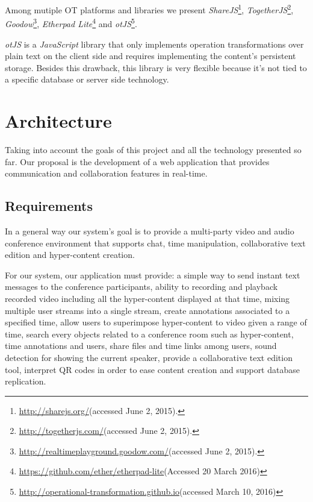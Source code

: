 \documentclass[conference,compsoc,a4paper]{IEEEtran}
\begin{document}
	Among mutiple \gls{OT} platforms and libraries we present \emph{ShareJS}\footnote{\url{http://sharejs.org/}(accessed June 2, 2015).}, \emph{TogetherJS}\footnote{\url{http://togetherjs.com/}(accessed June 2, 2015).}, \emph{Goodow}\footnote{\url{http://realtimeplayground.goodow.com/}(accessed June 2, 2015).}, \emph{Etherpad Lite}\footnote{\url{https://github.com/ether/etherpad-lite}(Accessed 20 March 2016)} and \emph{otJS}\footnote{\url{http://operational-transformation.github.io}(accessed March 10, 2016)}.


	\emph{otJS} is a \emph{JavaScript} library that only implements operation transformations over plain text on the client side and requires implementing the content's persistent storage. Besides this drawback, this library is very flexible because it's not tied to a specific database or server side technology.
        


\section{Architecture}
\label{chapter:architecture}

Taking into account the goals of this project and all the technology presented so far. Our proposal is the development of a web application that provides communication and collaboration features in real-time.

\subsection{Requirements}
In a general way our system's goal is to provide a multi-party video and audio conference environment that supports chat, time manipulation, collaborative text edition and hyper-content creation.


For our system, our application must provide: a simple way to send instant text messages to the conference participants, ability to recording and playback recorded video including all the hyper-content displayed at that time, mixing multiple user streams into a single stream, create annotations associated to a specified time, allow users to superimpose hyper-content to video given a range of time, search every objects related to a conference room such as hyper-content, time annotations and users, share files and time links among users, sound detection for showing the current speaker, provide a collaborative text edition tool, interpret \gls{QR} codes in order to ease content creation and support database replication.
\end{document}
